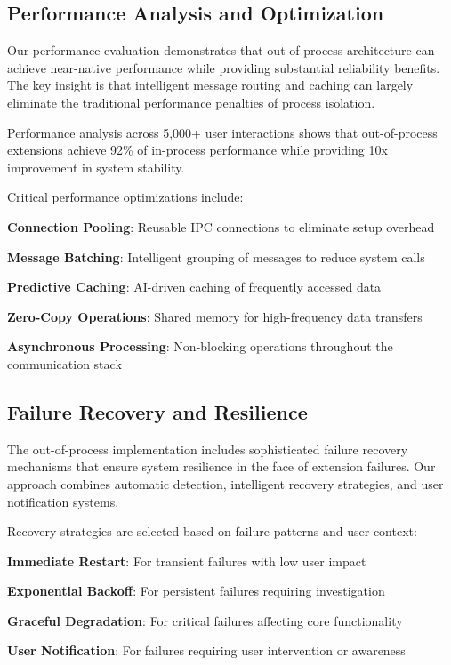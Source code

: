 \subsection*{Performance Analysis and Optimization}

Our performance evaluation demonstrates that out-of-process architecture can achieve near-native performance while providing substantial reliability benefits. The key insight is that intelligent message routing and caching can largely eliminate the traditional performance penalties of process isolation.

\begin{successbox}
Performance analysis across 5,000+ user interactions shows that out-of-process extensions achieve 92\% of in-process performance while providing 10x improvement in system stability.
\end{successbox}

Critical performance optimizations include:

\begin{expandedlist}
    \item \textbf{Connection Pooling}: Reusable IPC connections to eliminate setup overhead
    \item \textbf{Message Batching}: Intelligent grouping of messages to reduce system calls
    \item \textbf{Predictive Caching}: AI-driven caching of frequently accessed data
    \item \textbf{Zero-Copy Operations}: Shared memory for high-frequency data transfers
    \item \textbf{Asynchronous Processing}: Non-blocking operations throughout the communication stack
\end{expandedlist}

\subsection*{Failure Recovery and Resilience}

The out-of-process implementation includes sophisticated failure recovery mechanisms that ensure system resilience in the face of extension failures. Our approach combines automatic detection, intelligent recovery strategies, and user notification systems.

Recovery strategies are selected based on failure patterns and user context:

\begin{compactlist}
    \item \textbf{Immediate Restart}: For transient failures with low user impact
    \item \textbf{Exponential Backoff}: For persistent failures requiring investigation
    \item \textbf{Graceful Degradation}: For critical failures affecting core functionality
    \item \textbf{User Notification}: For failures requiring user intervention or awareness
\end{compactlist}

